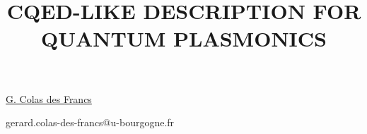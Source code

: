 \title{CQED-LIKE DESCRIPTION FOR QUANTUM PLASMONICS}

\underline{G. Colas des Francs}  


\email gerard.colas-des-francs@u-bourgogne.fr


\vspace{\baselineskip}